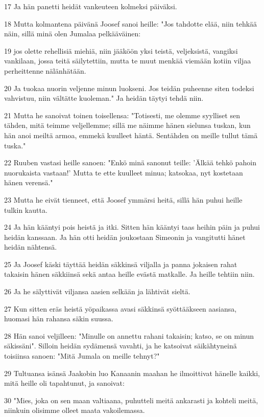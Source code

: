 \par 17 Ja hän panetti heidät vankeuteen kolmeksi päiväksi.
\par 18 Mutta kolmantena päivänä Joosef sanoi heille: "Jos tahdotte elää, niin tehkää näin, sillä minä olen Jumalaa pelkääväinen:
\par 19 jos olette rehellisiä miehiä, niin jääköön yksi teistä, veljeksistä, vangiksi vankilaan, jossa teitä säilytettiin, mutta te muut menkää viemään kotiin viljaa perheittenne nälänhätään.
\par 20 Ja tuokaa nuorin veljenne minun luokseni. Jos teidän puheenne siten todeksi vahvistuu, niin vältätte kuoleman." Ja heidän täytyi tehdä niin.
\par 21 Mutta he sanoivat toinen toisellensa: "Totisesti, me olemme syylliset sen tähden, mitä teimme veljellemme; sillä me näimme hänen sielunsa tuskan, kun hän anoi meiltä armoa, emmekä kuulleet häntä. Sentähden on meille tullut tämä tuska."
\par 22 Ruuben vastasi heille sanoen: "Enkö minä sanonut teille: 'Älkää tehkö pahoin nuorukaista vastaan!' Mutta te ette kuulleet minua; katsokaa, nyt kostetaan hänen verensä."
\par 23 Mutta he eivät tienneet, että Joosef ymmärsi heitä, sillä hän puhui heille tulkin kautta.
\par 24 Ja hän kääntyi pois heistä ja itki. Sitten hän kääntyi taas heihin päin ja puhui heidän kanssaan. Ja hän otti heidän joukostaan Simeonin ja vangitutti hänet heidän nähtensä.
\par 25 Ja Joosef käski täyttää heidän säkkinsä viljalla ja panna jokaisen rahat takaisin hänen säkkiinsä sekä antaa heille evästä matkalle. Ja heille tehtiin niin.
\par 26 Ja he sälyttivät viljansa aasien selkään ja lähtivät sieltä.
\par 27 Kun sitten eräs heistä yöpaikassa avasi säkkinsä syöttääkseen aasiansa, huomasi hän rahansa säkin suussa.
\par 28 Hän sanoi veljilleen: "Minulle on annettu rahani takaisin; katso, se on minun säkissäni". Silloin heidän sydämensä vavahti, ja he katsoivat säikähtyneinä toisiinsa sanoen: "Mitä Jumala on meille tehnyt?"
\par 29 Tultuansa isänsä Jaakobin luo Kanaanin maahan he ilmoittivat hänelle kaikki, mitä heille oli tapahtunut, ja sanoivat:
\par 30 "Mies, joka on sen maan valtiaana, puhutteli meitä ankarasti ja kohteli meitä, niinkuin olisimme olleet maata vakoilemassa.
